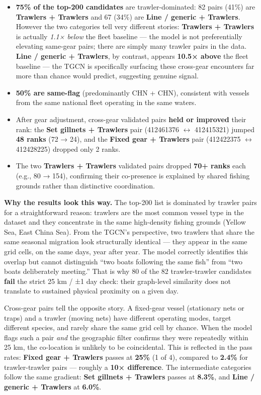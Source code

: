 \documentclass[
]{article}
\providecommand{\tightlist}{%
  \setlength{\itemsep}{0pt}\setlength{\parskip}{0pt}}
\begin{document}
\begin{itemize}
\tightlist
\item
  \textbf{75\% of the top-200 candidates} are trawler-dominated: 82
  pairs (41\%) are \textbf{Trawlers + Trawlers} and 67 (34\%) are
  \textbf{Line / generic + Trawlers}. However the two categories tell
  very different stories: \textbf{Trawlers + Trawlers} is actually
  \emph{1.1× below} the fleet baseline --- the model is not
  preferentially elevating same-gear pairs; there are simply many
  trawler pairs in the data. \textbf{Line / generic + Trawlers}, by
  contrast, appears \textbf{10.5× above} the fleet baseline --- the TGCN
  is specifically surfacing these cross-gear encounters far more than
  chance would predict, suggesting genuine signal.
\item
  \textbf{50\% are same-flag} (predominantly CHN + CHN), consistent with
  vessels from the same national fleet operating in the same waters.
\item
  After gear adjustment, cross-gear validated pairs \textbf{held or
  improved} their rank: the \textbf{Set gillnets + Trawlers} pair
  (412461376 \(\leftrightarrow\) 412415321) jumped \textbf{48 ranks} (72
  → 24), and the \textbf{Fixed gear + Trawlers} pair (412422375
  \(\leftrightarrow\) 412428225) dropped only 2 ranks.
\item
  The two \textbf{Trawlers + Trawlers} validated pairs dropped
  \textbf{70+ ranks} each (e.g., 80 → 154), confirming their co-presence
  is explained by shared fishing grounds rather than distinctive
  coordination.
\end{itemize}

\textbf{Why the results look this way.} The top-200 list is dominated by
trawler pairs for a straightforward reason: trawlers are the most common
vessel type in the dataset and they concentrate in the same high-density
fishing grounds (Yellow Sea, East China Sea). From the TGCN's
perspective, two trawlers that share the same seasonal migration look
structurally identical --- they appear in the same grid cells, on the
same days, year after year. The model correctly identifies this overlap
but cannot distinguish ``two boats following the same fish'' from ``two
boats deliberately meeting.'' That is why 80 of the 82 trawler-trawler
candidates \textbf{fail} the strict 25 km / ±1 day check: their
graph-level similarity does not translate to sustained physical
proximity on a given day.

Cross-gear pairs tell the opposite story. A fixed-gear vessel
(stationary nets or traps) and a trawler (moving nets) have different
operating modes, target different species, and rarely share the same
grid cell by chance. When the model flags such a pair \emph{and} the
geographic filter confirms they were repeatedly within 25 km, the
co-location is unlikely to be coincidental. This is reflected in the
pass rates: \textbf{Fixed gear + Trawlers} passes at \textbf{25\%} (1 of
4), compared to \textbf{2.4\%} for trawler-trawler pairs --- roughly a
\textbf{10× difference}. The intermediate categories follow the same
gradient: \textbf{Set gillnets + Trawlers} passes at \textbf{8.3\%}, and
\textbf{Line / generic + Trawlers} at \textbf{6.0\%}.
\end{document}
